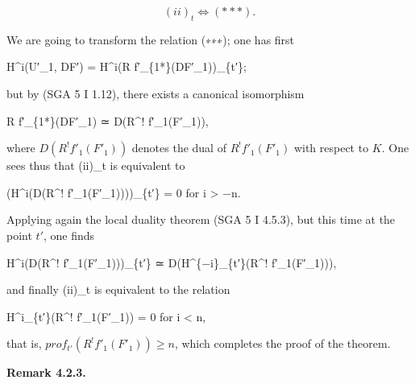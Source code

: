 \documentclass[
  11pt,
  a4paper,
]{book}
\newenvironment{Shaded}{}{}
\newcommand{\NormalTok}[1]{#1}
\begin{document}
\[ (ii)_{t} \Leftrightarrow (\ast\ast\ast). \]

We are going to transform the relation (∗∗∗); one has first

\begin{Shaded}
\begin{Highlighting}[]
\NormalTok{H\^{}i(U′\_1, DF′) = H\^{}i(R f′\_\{1*\}(DF′\_1))\_\{t′\};}
\end{Highlighting}
\end{Shaded}

but by (SGA 5 I 1.12), there exists a canonical isomorphism

\begin{Shaded}
\begin{Highlighting}[]
\NormalTok{R f′\_\{1*\}(DF′\_1) ≃ D(R\^{}! f′\_1(F′\_1)),}
\end{Highlighting}
\end{Shaded}

where \(D(R^{!} f'_{1}(F'_{1}))\) denotes the dual of
\(R^{!} f'_{1}(F'_{1})\) with respect to \(K\). One sees thus that
(ii)\_t is equivalent to

\begin{Shaded}
\begin{Highlighting}[]
\NormalTok{(H\^{}i(D(R\^{}! f′\_1(F′\_1))))\_\{t′\} = 0 for i \textgreater{} −n.}
\end{Highlighting}
\end{Shaded}

Applying again the local duality theorem (SGA 5 I 4.5.3), but this time
at the point \(t'\), one finds

\begin{Shaded}
\begin{Highlighting}[]
\NormalTok{H\^{}i(D(R\^{}! f′\_1(F′\_1)))\_\{t′\} ≃ D(H\^{}\{−i\}\_\{t′\}(R\^{}! f′\_1(F′\_1))),}
\end{Highlighting}
\end{Shaded}

and finally (ii)\_t is equivalent to the relation

\begin{Shaded}
\begin{Highlighting}[]
\NormalTok{H\^{}i\_\{t′\}(R\^{}! f′\_1(F′\_1)) = 0 for i \textless{} n,}
\end{Highlighting}
\end{Shaded}

that is, \(prof_{t'}(R^{!} f'_{1}(F'_{1})) \geqslant n\), which
completes the proof of the theorem.

\textbf{Remark 4.2.3.}
\end{document}
